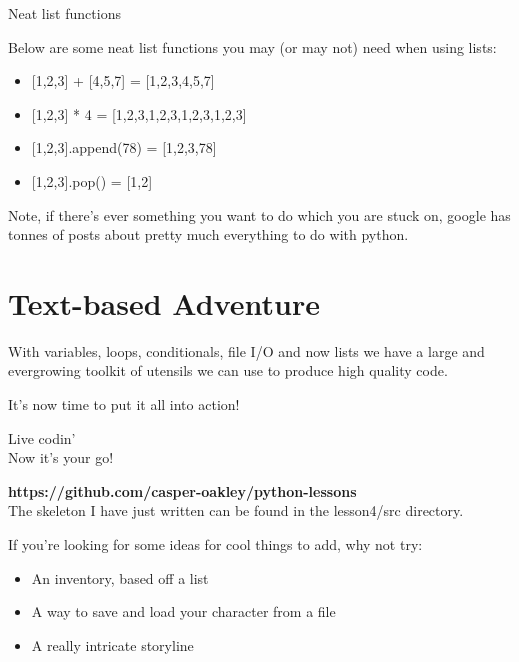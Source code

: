 \documentclass{beamer}
\begin{document}
\begin{frame}{Neat list functions}

Below are some neat list functions you may (or may not) need when using lists:
\pause

\begin{itemize}
  \item {[}1,2,3{]} + {[}4,5,7{]} \pause = {[}1,2,3,4,5,7{]} \pause
  \item {[}1,2,3{]} * 4 \pause = {[}1,2,3,1,2,3,1,2,3,1,2,3{]} \pause
  \item {[}1,2,3{]}.append(78) \pause = {[}1,2,3,78{]} \pause
  \item {[}1,2,3{]}.pop() \pause = {[}1,2{]} \pause
\end{itemize}

Note, if there's ever something you want to do which you are stuck on, google has tonnes of posts about pretty much everything to do with python.\\

\end{frame}

\section{Text-based Adventure}

\begin{frame}

With variables, loops, conditionals, file I/O and now lists we have a large and evergrowing toolkit of utensils we can use to produce high quality code.\\ \pause

It's now time to put it all into action!\\

\end{frame}

\begin{frame}

Live codin'\\
\pause
Now it's your go!
\end{frame}

\begin{frame}

\textbf{https://github.com/casper-oakley/python-lessons} \\

The skeleton I have just written can be found in the lesson4/src directory.\\ \pause

If you're looking for some ideas for cool things to add, why not try:
\begin{itemize}
  \item An inventory, based off a list
  \item A way to save and load your character from a file
  \item A really intricate storyline
\end{itemize}

\end{frame}
\end{document}
